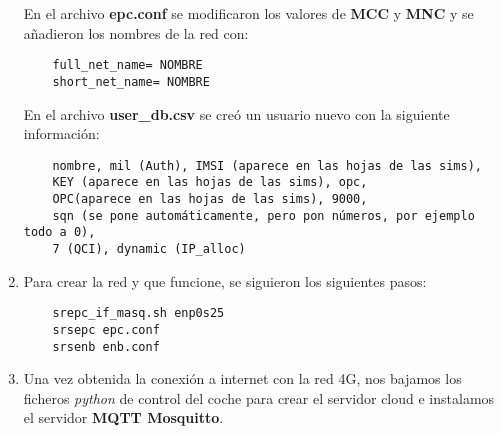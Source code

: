 \begin{enumerate}
En el archivo \textbf{epc.conf} se modificaron los valores de \textbf{MCC} y \textbf{MNC} y se añadieron los nombres de la red con:
\begin{lstlisting}
    full_net_name= NOMBRE
    short_net_name= NOMBRE
\end{lstlisting}

En el archivo \textbf{user_db.csv} se creó un usuario nuevo con la siguiente información:
\begin{lstlisting}
    nombre, mil (Auth), IMSI (aparece en las hojas de las sims),
    KEY (aparece en las hojas de las sims), opc,
    OPC(aparece en las hojas de las sims), 9000,
    sqn (se pone automáticamente, pero pon números, por ejemplo todo a 0),
    7 (QCI), dynamic (IP_alloc)
\end{lstlisting}

\item Para crear la red y que funcione, se siguieron los siguientes pasos:
\begin{lstlisting}
    srepc_if_masq.sh enp0s25
    srsepc epc.conf
    srsenb enb.conf
\end{lstlisting}

\item Una vez obtenida la conexión a internet con la red 4G, nos bajamos los ficheros \textit{python} de control del coche para crear el servidor cloud e instalamos el servidor \textbf{MQTT Mosquitto}.

\end{enumerate}